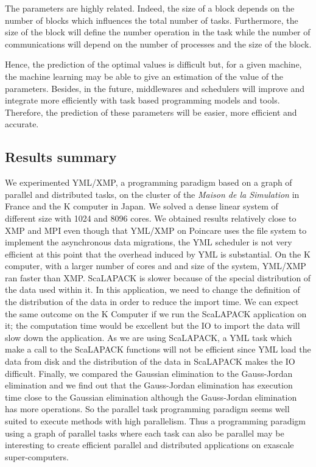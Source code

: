 The parameters are highly related.
Indeed, the size of a block depends on the number of blocks which influences the total number of tasks.
Furthermore, the size of the block will define the number operation in the task while the number of communications will depend on the number of processes and the size of the block.

Hence, the prediction of the optimal values is difficult but, for a given machine, the machine learning may be able to give an estimation of the value of the parameters.
Besides, in the future, middlewares and schedulers will improve and integrate more efficiently with task based programming models and tools.
Therefore, the prediction of these parameters will be easier, more efficient and accurate.

\subsection{Results summary}
We experimented YML/XMP, a programming paradigm based on a graph of parallel and distributed tasks, on the cluster of the \textit{Maison de la Simulation} in France and the K computer in Japan.
We solved a dense linear system of different size with 1024 and 8096 cores.
We obtained results relatively close to XMP and MPI even though that YML/XMP on Poincare uses the file system to implement the asynchronous data migrations, the YML scheduler is not very efficient at this point that the overhead induced by YML is substantial.
On the K computer, with a larger number of cores and and size of the system, YML/XMP ran faster than XMP.
ScaLAPACK is slower because of the special distribution of the data used within it.
In this application, we need to change the definition of the distribution of the data in order to reduce the import time.
We can expect the same outcome on the K Computer if we run the ScaLAPACK application on it; the computation time would be excellent but the IO to import the data will slow down the application.
As we are using ScaLAPACK, a YML task which make a call to the ScaLAPACK functions will not be efficient since YML load the data from disk and the distribution of the data in ScaLAPACK makes the IO difficult.
Finally, we compared the Gaussian elimination to the Gauss-Jordan elimination and we find out that the Gauss-Jordan elimination has execution time close to the Gaussian elimination although the Gauss-Jordan elimination has more operations.
So the parallel task programming paradigm seems well suited to execute methods with high parallelism.
Thus a programming paradigm using a graph of parallel tasks where each task can also be parallel may be interesting to create efficient parallel and distributed applications on exascale super-computers.

